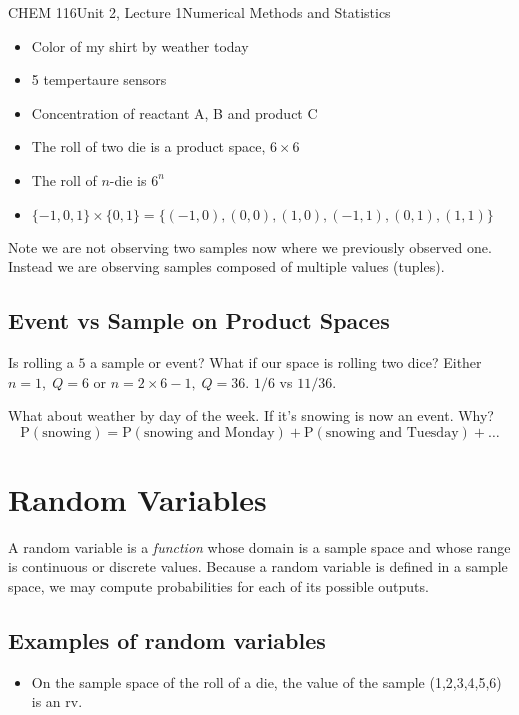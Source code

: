 \documentclass{article}
\renewcommand{\Pr}{\textrm{P}}
\begin{document}
\begin{tdoc}{CHEM 116}{Unit 2, Lecture 1}{Numerical Methods and Statistics}
\begin{itemize}

\item Color of my shirt by weather today
\item 5 tempertaure sensors
\item Concentration of reactant A, B and product C
\item The roll of two die is a product space, $6\times 6$
\item The roll of $n$-die is $6^n$
\item $\{-1,0,1\} \times \{0,1\} = \{(-1,0), (0,0), (1,0), (-1,1), (0,1), (1,1)\}$

\end{itemize}

Note we are not observing two samples now where we previously observed
one. Instead we are observing samples composed of multiple values
(tuples).

\subsection{Event vs Sample on Product Spaces}
Is rolling a $5$ a sample or event? What if our space is rolling two
dice? Either $n=1,\; Q=6$ or $n=2\times 6 - 1,\; Q=36$.  $1/6$ vs $11/36$.

What about weather by day of the week. If it's snowing is now an
event. Why?
\[
\Pr(\textrm{snowing}) = \Pr(\textrm{snowing and Monday}) + \Pr(\textrm{snowing and Tuesday}) + \ldots
\]

\section{Random Variables}

A random variable is a \emph{function} whose domain is a sample space
and whose range is continuous or discrete values. Because a random
variable is defined in a sample space, we may compute probabilities
for each of its possible outputs.

\subsection{Examples of random variables}

\begin{itemize}

\item On the sample space of the roll of a die, the value of the
  sample (1,2,3,4,5,6) is an rv.



\end{itemize}
\end{tdoc}
\end{document}
